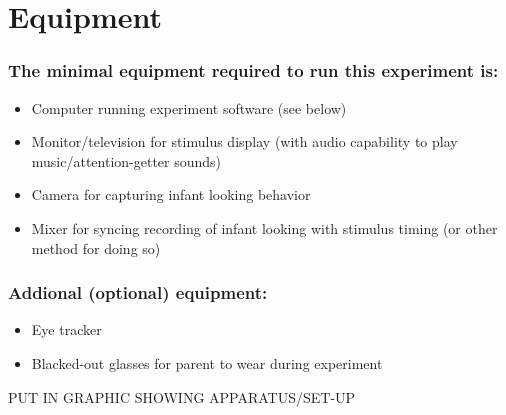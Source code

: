\documentclass[
  letterpaper,
  DIV=11,
  numbers=noendperiod,
  oneside]{scrreprt}
\providecommand{\tightlist}{%
  \setlength{\itemsep}{0pt}\setlength{\parskip}{0pt}}
\begin{document}
\section{Equipment}\label{equipment}

\subsubsection{The minimal equipment required to run this experiment
is:}\label{the-minimal-equipment-required-to-run-this-experiment-is}

\begin{itemize}
\tightlist
\item
  Computer running experiment software (see below)
\item
  Monitor/television for stimulus display (with audio capability to play
  music/attention-getter sounds)
\item
  Camera for capturing infant looking behavior
\item
  Mixer for syncing recording of infant looking with stimulus timing (or
  other method for doing so)
\end{itemize}

\subsubsection{Addional (optional)
equipment:}\label{addional-optional-equipment}

\begin{itemize}
\tightlist
\item
  Eye tracker
\item
  Blacked-out glasses for parent to wear during experiment
\end{itemize}

\begin{tcolorbox}[enhanced jigsaw, coltitle=black, colframe=quarto-callout-caution-color-frame, titlerule=0mm, colback=white, arc=.35mm, toprule=.15mm, left=2mm, colbacktitle=quarto-callout-caution-color!10!white, opacityback=0, bottomtitle=1mm, title=\textcolor{quarto-callout-caution-color}{\faFire}\hspace{0.5em}{Caution}, breakable, rightrule=.15mm, opacitybacktitle=0.6, toptitle=1mm, leftrule=.75mm, bottomrule=.15mm]

PUT IN GRAPHIC SHOWING APPARATUS/SET-UP

\end{tcolorbox}
\end{document}
